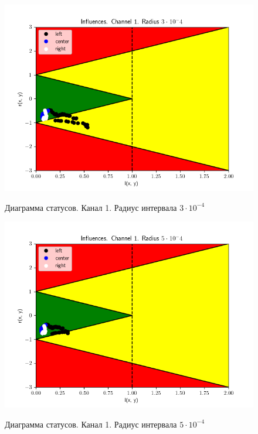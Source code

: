 \begin{figure}[H]
	\begin{center}
		\includegraphics[scale=0.83]{status_ch1_rad3}
		\label{pic:ch13}
		\caption{Диаграмма статусов. Канал 1. Радиус интервала $3 \cdot 10 ^ {-4}$}
	\end{center}
\end{figure}

\begin{figure}[H]
	\begin{center}
		\includegraphics[scale=0.83]{status_ch1_rad5}
		\label{pic:ch15}
		\caption{Диаграмма статусов. Канал 1. Радиус интервала $5 \cdot 10 ^ {-4}$}
	\end{center}
\end{figure}

